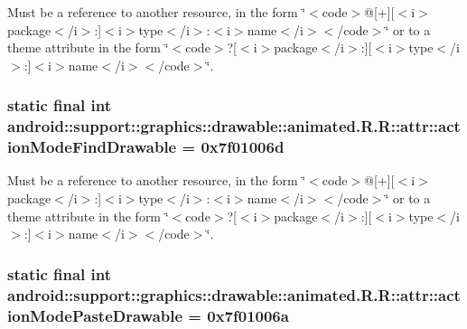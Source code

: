 Must be a reference to another resource, in the form \char`\"{}$<$code$>$@\mbox{[}+\mbox{]}\mbox{[}$<$i$>$package$<$/i$>$:\mbox{]}$<$i$>$type$<$/i$>$:$<$i$>$name$<$/i$>$$<$/code$>$\char`\"{} or to a theme attribute in the form \char`\"{}$<$code$>$?\mbox{[}$<$i$>$package$<$/i$>$:\mbox{]}\mbox{[}$<$i$>$type$<$/i$>$:\mbox{]}$<$i$>$name$<$/i$>$$<$/code$>$\char`\"{}. \hypertarget{classandroid_1_1support_1_1graphics_1_1drawable_1_1animated_1_1_r_1_1attr_c5e2df86bc40fbf00e7451a10631dc52}{
\subsubsection[{actionModeFindDrawable}]{\setlength{\rightskip}{0pt plus 5cm}static final int android::support::graphics::drawable::animated.R.R::attr::actionModeFindDrawable = 0x7f01006d}}
\label{classandroid_1_1support_1_1graphics_1_1drawable_1_1animated_1_1_r_1_1attr_c5e2df86bc40fbf00e7451a10631dc52}


Must be a reference to another resource, in the form \char`\"{}$<$code$>$@\mbox{[}+\mbox{]}\mbox{[}$<$i$>$package$<$/i$>$:\mbox{]}$<$i$>$type$<$/i$>$:$<$i$>$name$<$/i$>$$<$/code$>$\char`\"{} or to a theme attribute in the form \char`\"{}$<$code$>$?\mbox{[}$<$i$>$package$<$/i$>$:\mbox{]}\mbox{[}$<$i$>$type$<$/i$>$:\mbox{]}$<$i$>$name$<$/i$>$$<$/code$>$\char`\"{}. \hypertarget{classandroid_1_1support_1_1graphics_1_1drawable_1_1animated_1_1_r_1_1attr_01d0ffa0814d664f4e7cef4f90bb35ec}{
\subsubsection[{actionModePasteDrawable}]{\setlength{\rightskip}{0pt plus 5cm}static final int android::support::graphics::drawable::animated.R.R::attr::actionModePasteDrawable = 0x7f01006a}}
\label{classandroid_1_1support_1_1graphics_1_1drawable_1_1animated_1_1_r_1_1attr_01d0ffa0814d664f4e7cef4f90bb35ec}


